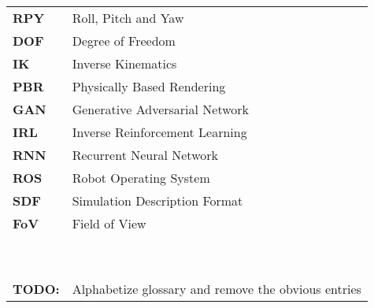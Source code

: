 \begin{table}[!hb]
\begin{tabular}{ll}
        \textbf{RPY}   & Roll, Pitch and Yaw                                        \\
        \textbf{DOF}   & Degree of Freedom                                          \\
        \textbf{IK}    & Inverse Kinematics                                         \\
        \textbf{PBR}   & Physically Based Rendering                                 \\
        \textbf{GAN}   & Generative Adversarial Network                             \\
        \textbf{IRL}   & Inverse Reinforcement Learning                             \\
        \textbf{RNN}   & Recurrent Neural Network                                   \\
        \textbf{ROS}   & Robot Operating System                                     \\
        \textbf{SDF}   & Simulation Description Format                              \\
        \textbf{FoV}   & Field of View                                              \\
        \textbf{}      &                                                            \\
        \textbf{}      &                                                            \\
        \textbf{}      &                                                            \\
        \textbf{}      &                                                            \\
        \textbf{}      &                                                            \\
        \textbf{}      &                                                            \\
        \textbf{}      &                                                            \\
        \textbf{}      &                                                            \\
        \textbf{}      &                                                            \\
        \textbf{TODO:} & Alphabetize glossary and remove the obvious entries        \\
    \end{tabular}
\end{table}
\capstarttrue
